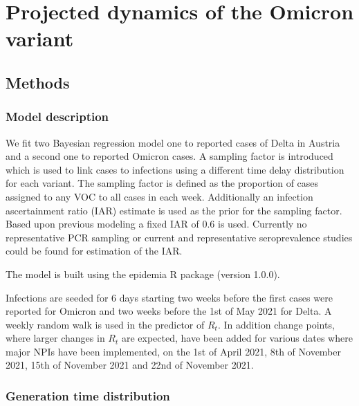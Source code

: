 \documentclass[
]{article}
\begin{document}
\hypertarget{projected-dynamics-of-the-omicron-variant}{%
\section{Projected dynamics of the Omicron variant}\label{projected-dynamics-of-the-omicron-variant}}

\hypertarget{methods}{%
\subsection{Methods}\label{methods}}

\hypertarget{model-description}{%
\subsubsection{Model description}\label{model-description}}

We fit two Bayesian regression model \autocite{flaxmanEstimatingEffectsNonpharmaceutical2020} one to reported cases of Delta in Austria and a second one to reported Omicron cases. A sampling factor is introduced which is used to link cases to infections using a different time delay distribution for each variant. The sampling factor is defined as the proportion of cases assigned to any VOC to all cases in each week. Additionally an infection ascertainment ratio (IAR) estimate is used as the prior for the sampling factor. Based upon previous modeling a fixed IAR of 0.6 is used. Currently no representative PCR sampling or
current and representative seroprevalence studies could be found for estimation of the IAR.

The model is built using the epidemia R package (version 1.0.0).

Infections are seeded for 6 days starting two weeks before the first cases were reported for Omicron and two weeks before the 1st of May 2021 for Delta. A weekly random walk is used in the predictor of \(R_t\). In addition change points, where larger changes in \(R_t\) are expected, have been added for various dates where major NPIs have been implemented, on the 1st of April 2021, 8th of November 2021, 15th of November 2021 and 22nd of November 2021.

\hypertarget{generation-time-distribution}{%
\subsubsection{Generation time distribution}\label{generation-time-distribution}}
\end{document}
